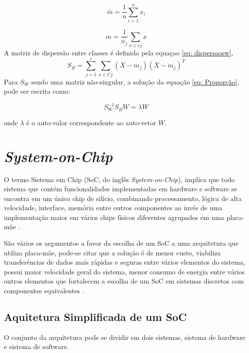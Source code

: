 \begin{equation}
	\label{eq: media}
	\bar m = \frac{1}{n}\sum_{i=1}^{n} {x_i}
\end{equation}

\begin{equation}
	\label{eq: media2}
	m = \frac{1}{n_j}\sum_{x \in c j}^{} x
\end{equation}
A matriz de dispersão entre classes é definida pela equaçao \ref{eq: dispersaosw},
\begin{equation}
	\label{eq: dispersaosw}
	 S_B = \sum_{j=1}^{c} \sum_{x \in C j}{} (X - m_j)(X - m_j)^T 
\end{equation}
Para $S_W$ sendo uma matriz não-singular, a solução da equação 
\ref{eq: Proporção}, pode ser escrita como: 

 \begin{equation}
	\label{eq: final}
	S_W^{-1} S_B W = \lambda W
\end{equation}
 
onde $\lambda$ é o auto-valor correspondente ao auto-vetor $W$.
\section{\textit{System-on-Chip}}

O termo Sistema em Chip (SoC, do inglês \textit{System-on-Chip}), implica que todo sistema que contém funcionalidades implementadas em hardware e software se encontra em um único chip de silício, combinando processamento, lógica de alta velocidade, interface, memória entre outros componentes ao invés de uma implementação maior em vários chips físicos diferentes agrupados em uma placa-mãe \cite{zynqBook}.

São vários os argumentos a favor da escolha de um SoC a uma arquitetura que utiliza placa-mãe, pode-se citar que a solução é de menor custo, viabiliza transferências de dados mais rápidas e seguras entre vários elementos do sistema, possui maior velocidade geral do sistema, menor consumo de energia entre vários outros elementos que fortalecem a escolha de um SoC em sistemas discretos com componentes equivalentes \cite{zynqBook}.

\subsection{Aquitetura Simplificada de um SoC}

O conjunto da arquitetura pode se dividir em dois sistemas, sistema de hardware  e sistema de software. 


